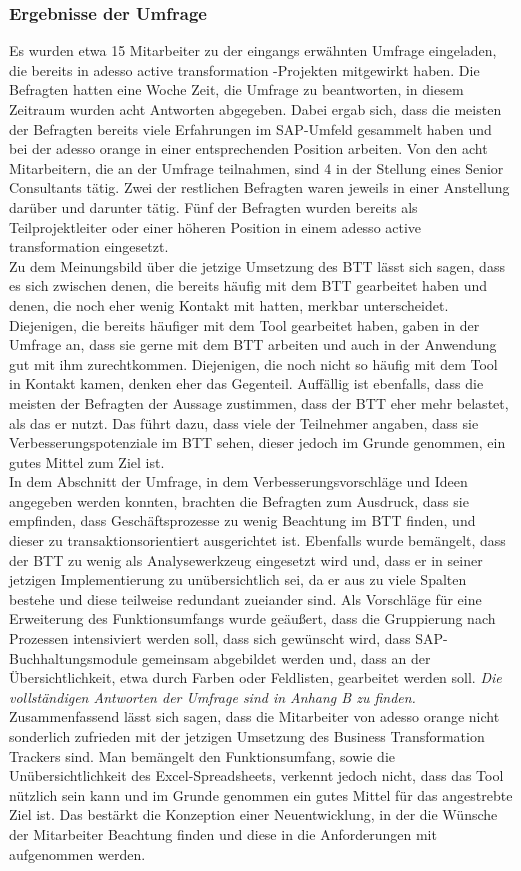 \subsubsection{Ergebnisse der Umfrage}
Es wurden etwa 15 Mitarbeiter zu der eingangs erwähnten Umfrage eingeladen, die bereits in adesso active transformation -Projekten mitgewirkt haben. Die Befragten hatten eine Woche Zeit, die Umfrage zu beantworten, in diesem Zeitraum wurden acht Antworten abgegeben. Dabei ergab sich, dass die meisten der Befragten bereits viele Erfahrungen im SAP-Umfeld gesammelt haben und bei der adesso orange in einer entsprechenden Position arbeiten. Von den acht Mitarbeitern, die an der Umfrage teilnahmen, sind 4 in der Stellung eines Senior Consultants tätig. Zwei der restlichen Befragten waren jeweils in einer Anstellung darüber und darunter tätig. Fünf der Befragten wurden bereits als Teilprojektleiter oder einer höheren Position in einem adesso active transformation eingesetzt. 
\\Zu dem Meinungsbild über die jetzige Umsetzung des BTT lässt sich sagen, dass es sich zwischen denen, die bereits häufig mit dem BTT gearbeitet haben und denen, die noch eher wenig Kontakt mit hatten, merkbar unterscheidet. Diejenigen, die bereits häufiger mit dem Tool gearbeitet haben, gaben in der Umfrage an, dass sie gerne mit dem BTT arbeiten und auch in der Anwendung gut mit ihm zurechtkommen. Diejenigen, die noch nicht so häufig mit dem Tool in Kontakt kamen, denken eher das Gegenteil. Auffällig ist ebenfalls, dass die meisten der Befragten der Aussage zustimmen, dass der BTT eher mehr belastet, als das er nutzt. Das führt dazu, dass viele der Teilnehmer angaben, dass sie Verbesserungspotenziale im BTT sehen, dieser jedoch im Grunde genommen, ein gutes Mittel zum Ziel ist.\\
In dem Abschnitt der Umfrage, in dem Verbesserungsvorschläge und Ideen angegeben werden konnten, brachten die Befragten zum Ausdruck, dass sie empfinden, dass Geschäftsprozesse zu wenig Beachtung im BTT finden, und dieser zu transaktionsorientiert ausgerichtet ist. Ebenfalls wurde bemängelt, dass der BTT zu wenig als Analysewerkzeug eingesetzt wird und, dass er in seiner jetzigen Implementierung zu unübersichtlich sei, da er aus zu viele Spalten bestehe und diese teilweise redundant zueiander sind. Als Vorschläge für eine Erweiterung des Funktionsumfangs wurde geäußert, dass die Gruppierung nach Prozessen intensiviert werden soll, dass sich gewünscht wird, dass SAP-Buchhaltungsmodule gemeinsam abgebildet werden und, dass an der Übersichtlichkeit, etwa durch Farben oder Feldlisten, gearbeitet werden soll. \emph{Die vollständigen Antworten der Umfrage sind in Anhang B zu finden.}
\\Zusammenfassend lässt sich sagen, dass die Mitarbeiter von adesso orange nicht sonderlich zufrieden mit der jetzigen Umsetzung des Business Transformation Trackers sind. Man bemängelt den Funktionsumfang, sowie die Unübersichtlichkeit des Excel-Spreadsheets, verkennt jedoch nicht, dass das Tool nützlich sein kann und im Grunde genommen ein gutes Mittel für das angestrebte Ziel ist. Das bestärkt die Konzeption einer Neuentwicklung, in der die Wünsche der Mitarbeiter Beachtung finden und diese in die Anforderungen mit aufgenommen werden. 

